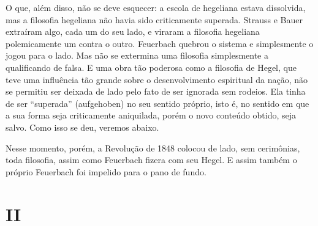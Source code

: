 O que, além disso, não se deve esquecer: a escola
de hegeliana estava
dissolvida, mas a filosofia hegeliana não havia sido criticamente
superada. Strauss e Bauer extraíram
algo, cada um do seu lado, e viraram a filosofia hegeliana polemicamente
um contra o
outro. Feuerbach quebrou
o sistema e simplesmente o jogou para o lado. Mas não se extermina uma
filosofia simplesmente a qualificando de falsa. E uma obra tão poderosa
como a filosofia
de Hegel,
que teve uma influência tão grande sobre o desenvolvimento espiritual da
nação, não se permitiu ser deixada de lado pelo fato de ser ignorada sem
rodeios. Ela tinha de ser ``superada'' (aufgehoben) no seu sentido
próprio, isto é, no sentido em que a sua forma seja criticamente
aniquilada, porém o novo conteúdo obtido, seja salvo. Como isso se deu,
veremos abaixo.

Nesse momento, porém, a Revolução de 1848 colocou de lado, sem
cerimônias, toda filosofia, assim como Feuerbach fizera com seu Hegel. E assim também o próprio Feuerbach foi impelido para o pano de fundo.

\pagebreak

\section{II}

